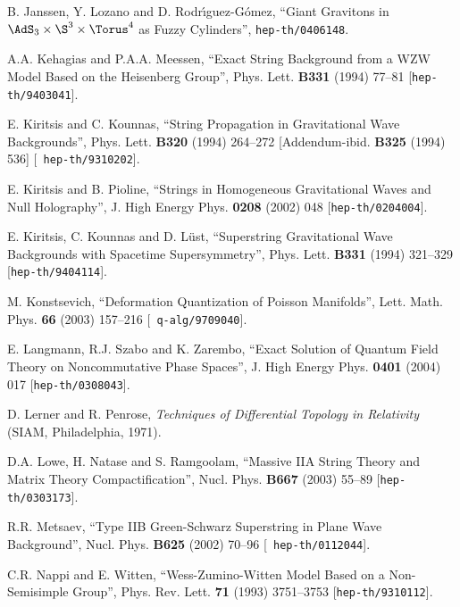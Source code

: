 \begin{thebibliography}{199}
 B. Janssen, Y. Lozano and D. Rodr\'{\i}guez-G\'omez,
  ``Giant Gravitons in $\AdS_3\times\S^3\times\Torus^4$ as Fuzzy
  Cylinders'', {\tt hep-th/0406148}.

 A.A. Kehagias and P.A.A. Meessen, ``Exact String
  Background from a WZW Model Based on the Heisenberg Group'',
  Phys. Lett. {\bf B331} (1994) 77--81 [{\tt hep-th/9403041}].

 E. Kiritsis and C. Kounnas, ``String Propagation in
  Gravitational Wave Backgrounds'', Phys. Lett. {\bf B320} (1994)
  264--272 [Addendum-ibid. {\bf B325} (1994) 536] [{\tt
    hep-th/9310202}].

 E. Kiritsis and B. Pioline, ``Strings in Homogeneous
  Gravitational Waves and Null Holography'', J. High Energy Phys. {\bf
    0208} (2002) 048 [{\tt hep-th/0204004}].

 E. Kiritsis, C. Kounnas and D. L\"ust, ``Superstring
  Gravitational Wave Backgrounds with Spacetime Supersymmetry'',
  Phys. Lett. {\bf B331} (1994) 321--329 [{\tt hep-th/9404114}].

 M. Konstsevich, ``Deformation Quantization of Poisson
  Manifolds'', Lett. Math. Phys. {\bf 66} (2003) 157--216 [{\tt
    q-alg/9709040}].

 E. Langmann, R.J. Szabo and K. Zarembo, ``Exact
  Solution of Quantum Field Theory on Noncommutative Phase Spaces'',
  J. High Energy Phys. {\bf 0401} (2004) 017 [{\tt hep-th/0308043}].

 D. Lerner and R. Penrose, {\it Techniques of
    Differential Topology in Relativity} (SIAM, Philadelphia, 1971).

 D.A. Lowe, H. Natase and S. Ramgoolam, ``Massive IIA
  String Theory and Matrix Theory Compactification'', Nucl. Phys. {\bf
    B667} (2003) 55--89 [{\tt hep-th/0303173}].

 R.R. Metsaev, ``Type IIB Green-Schwarz Superstring in
  Plane Wave Background'', Nucl. Phys. {\bf B625} (2002) 70--96 [{\tt
    hep-th/0112044}].

 C.R. Nappi and E. Witten, ``Wess-Zumino-Witten Model Based on a
  Non-Semisimple Group'', Phys. Rev. Lett. {\bf 71} (1993) 3751--3753
  [{\tt hep-th/9310112}].


\end{thebibliography}
